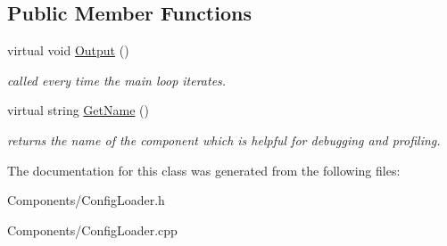 \subsection*{\-Public \-Member \-Functions}
\begin{DoxyCompactItemize}
\item 
\hypertarget{class_config_loader_a202db8d7509c10d7b085afa961f07b59}{
virtual void \hyperlink{class_config_loader_a202db8d7509c10d7b085afa961f07b59}{\-Output} ()}
\label{class_config_loader_a202db8d7509c10d7b085afa961f07b59}

\begin{DoxyCompactList}\small\item\em called every time the main loop iterates. \end{DoxyCompactList}\item 
\hypertarget{class_config_loader_abedfd1b6dd4b18bdc211bc6ba37e70f0}{
virtual string \hyperlink{class_config_loader_abedfd1b6dd4b18bdc211bc6ba37e70f0}{\-Get\-Name} ()}
\label{class_config_loader_abedfd1b6dd4b18bdc211bc6ba37e70f0}

\begin{DoxyCompactList}\small\item\em returns the name of the component which is helpful for debugging and profiling. \end{DoxyCompactList}\end{DoxyCompactItemize}


\-The documentation for this class was generated from the following files\-:\begin{DoxyCompactItemize}
\item 
\-Components/\-Config\-Loader.\-h\item 
\-Components/\-Config\-Loader.\-cpp\end{DoxyCompactItemize}
